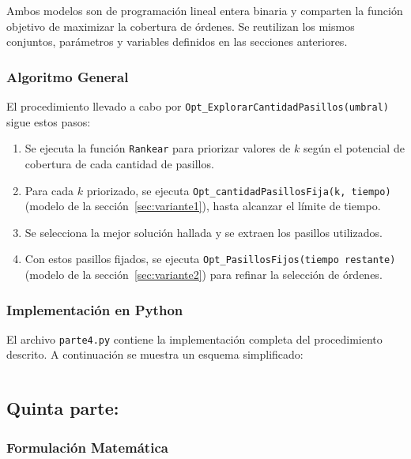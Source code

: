 \documentclass[a4paper,12pt]{article}
\begin{document}
Ambos modelos son de programación lineal entera binaria y comparten la función objetivo de maximizar la cobertura de órdenes. Se reutilizan los mismos conjuntos, parámetros y variables definidos en las secciones anteriores.

\subsubsection{Algoritmo General}

El procedimiento llevado a cabo por 
\texttt{Opt\_ExplorarCantidadPasillos(umbral)} sigue estos pasos:

\begin{enumerate}
    \item Se ejecuta la función \texttt{Rankear} para priorizar valores de \(k\) según el potencial de cobertura de cada cantidad de pasillos.
    \item Para cada \(k\) priorizado, se ejecuta \texttt{Opt\_cantidadPasillosFija(k, tiempo)} (modelo de la sección~\ref{sec:variante1}), hasta alcanzar el límite de tiempo.
    \item Se selecciona la mejor solución hallada y se extraen los pasillos utilizados.
    \item Con estos pasillos fijados, se ejecuta \texttt{Opt\_PasillosFijos(tiempo restante)} (modelo de la sección~\ref{sec:variante2}) para refinar la selección de órdenes.
\end{enumerate}
\subsubsection{Implementación en Python}

El archivo \texttt{parte4.py} contiene la implementación completa del procedimiento descrito. A continuación se muestra un esquema simplificado:

\begin{lstlisting}[language=Python, caption=Algoritmo general de exploración y refinamiento]

\end{lstlisting}

\clearpage

\subsection{Quinta parte:}
\label{sec:variante5}


\subsubsection{Formulación Matemática}
\end{document}
